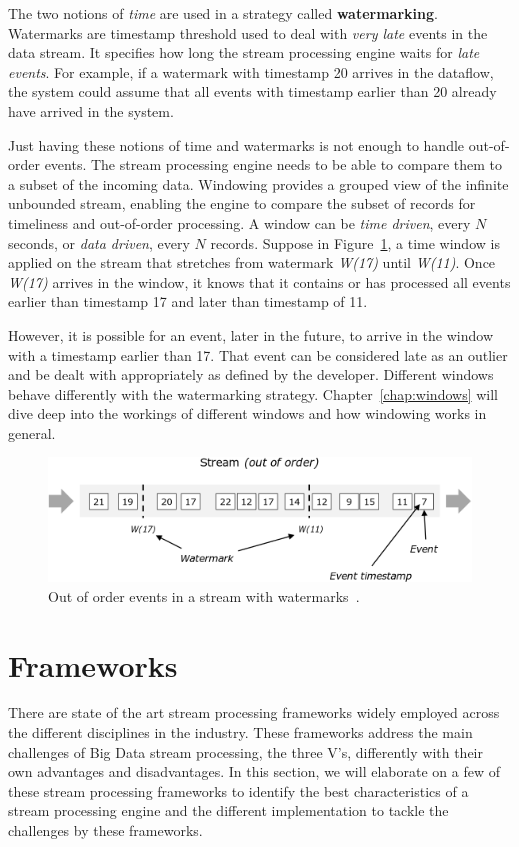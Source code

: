 The two notions of \emph{time} are used in a strategy called \textbf{watermarking}. 
Watermarks are timestamp threshold used to deal with \emph{very late} events 
in the data stream. It specifies how long the stream processing engine 
waits for \emph{late events}. For example, if a watermark with timestamp 
20 arrives in the dataflow, the system could assume that all events 
with timestamp earlier than 20 already have arrived in the system. 

Just having these notions of time and watermarks is not enough to 
handle out-of-order events. The stream processing engine needs to be able to compare them to a subset of the 
incoming data. Windowing provides a grouped view of the infinite unbounded stream, 
enabling the engine to compare the subset of records for timeliness and out-of-order 
processing. A window can be \emph{time driven}, every $N$ seconds, or \emph{data driven}, 
every $N$ records. 
Suppose in Figure~\ref{fig:watermark}, a time window is applied on the stream that
stretches from watermark \emph{W(17)} until \emph{W(11)}. 
Once \emph{W(17)} arrives in the window, it knows that it contains or has 
processed all events earlier than timestamp 17 and later than timestamp of 11.  

However, it is possible for an event, later in the future, to arrive in the window 
with a timestamp earlier than 17. That event can be considered late as an outlier and 
be dealt with appropriately as defined by the developer. Different windows 
behave differently with the watermarking strategy. Chapter~\ref{chap:windows}
will dive deep into the workings of different windows and how windowing works in 
general. 


\begin{figure}[htpb]
    \centering
    \includegraphics[width=0.8\linewidth]{fig/stream_watermark_out_of_order.png}
    \caption{Out of order events in a stream with watermarks~\cite{watermark_flink}.}
    \label{fig:watermark}
\end{figure}


\section{Frameworks}
\label{sec:frameworks}
There are state of the art stream processing frameworks widely employed across the 
different disciplines in the industry. These frameworks address the main challenges of 
Big Data stream processing, the three V's, differently with their own advantages and 
disadvantages.
In this section, we will elaborate 
on a few of these stream processing frameworks to identify the best characteristics of a 
stream processing engine and the different implementation to tackle the challenges by these 
frameworks.



